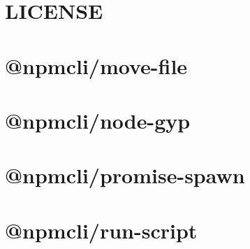\documentclass[twoside]{book}
\newcommand{\+}{\discretionary{\mbox{\scriptsize$\hookleftarrow$}}{}{}}
\begin{document}
\chapter{LICENSE}
\label{md__c___users_vaishnavi_jadhav__desktop__developer_code_mean_stack_example_client_node_modules__npmcli_move_file__l_i_c_e_n_s_e}

\chapter{@npmcli/move-\/file}
\label{md__c___users_vaishnavi_jadhav__desktop__developer_code_mean_stack_example_client_node_modules__npmcli_move_file__r_e_a_d_m_e}

\chapter{@npmcli/node-\/gyp}
\label{md__c___users_vaishnavi_jadhav__desktop__developer_code_mean_stack_example_client_node_modules__npmcli_node_gyp__r_e_a_d_m_e}

\chapter{@npmcli/promise-\/spawn}
\label{md__c___users_vaishnavi_jadhav__desktop__developer_code_mean_stack_example_client_node_modules__9b83b0a72de8084d0bf878f77f6ffcb5}

\chapter{@npmcli/run-\/script}
\label{md__c___users_vaishnavi_jadhav__desktop__developer_code_mean_stack_example_client_node_modules__npmcli_run_script__r_e_a_d_m_e}

\end{document}
